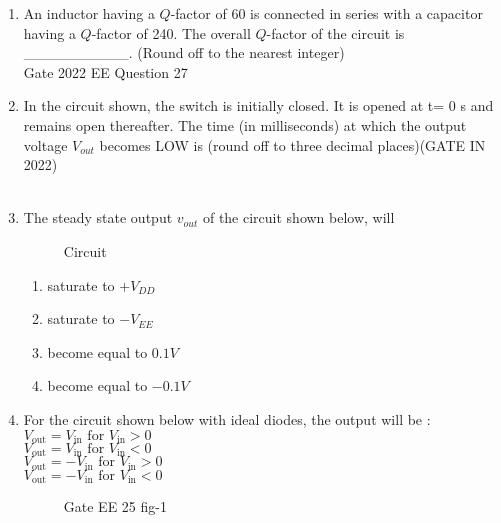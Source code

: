 \begin{enumerate}[label=\thechapter.\arabic*,ref=\thechapter.\theenumi]
\item An inductor having a $Q$-factor of 60 is connected in series with a capacitor having a $Q$-factor of 240. The overall $Q$-factor of the circuit is \_\_\_\_\_\_\_\_\_\_. (Round off to the nearest integer) \\
\hfill Gate 2022 EE Question 27\\
\solution

\pagebreak

\item In the circuit shown, the switch is initially closed. It is opened at t= 0 s and
remains open thereafter. The time (in milliseconds) at which the output voltage
$V_{out}$ becomes LOW is  (round off to three decimal places)\hfill(GATE IN 2022)\\

\solution\\

\pagebreak

\item The steady state output $v_{out}$ of the circuit shown below, will
\begin{figure}[h]
    \centering
    
    \caption{Circuit}
    \label{fig: 217.EE.16.1}
\end{figure}

\begin{enumerate}
    \item saturate to $+V_{DD}$
    \item saturate to $-V_{EE}$
    \item become equal to $0.1V$
    \item become equal to $-0.1V$
\end{enumerate}
\solution

\pagebreak

\item For the circuit shown below with ideal diodes, the output will be :\\
 $V_{\text{out}} = V_{\text{in}} \text{ for } V_{\text{in}}>0 $ \\
 $V_{\text{out}} = V_{\text{in}} \text{ for } V_{\text{in}}<0 $ \\
 $V_{\text{out}} = -V_{\text{in}} \text{ for } V_{\text{in}}>0 $ \\
 $V_{\text{out}} = -V_{\text{in}} \text{ for } V_{\text{in}}<0 $ \\

\begin{figure}[ht]
  \centering
  \resizebox{0.55\columnwidth}{!}{}
  \caption{Gate EE 25 fig-1}
  \label{fig:gate_ee_25_1}
\end{figure}
\solution

\pagebreak


\end{enumerate}
